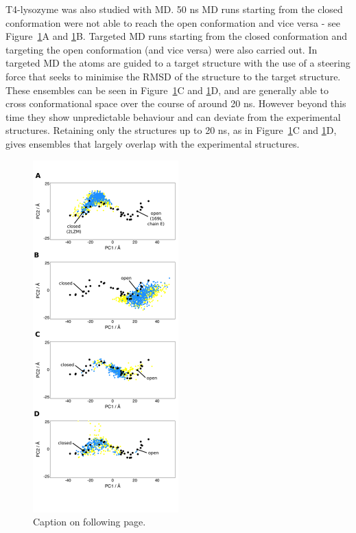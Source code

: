 T4-lysozyme was also studied with MD.
50 ns MD runs starting from the closed conformation were not able to reach the open conformation and vice versa - see Figure~\ref{fig:t4l_md}A and \ref{fig:t4l_md}B.
Targeted MD runs starting from the closed conformation and targeting the open conformation (and vice versa) were also carried out.
In targeted MD the atoms are guided to a target structure with the use of a steering force that seeks to minimise the RMSD of the structure to the target structure.
These ensembles can be seen in Figure~\ref{fig:t4l_md}C and \ref{fig:t4l_md}D, and are generally able to cross conformational space over the course of around 20 ns.
However beyond this time they show unpredictable behaviour and can deviate from the experimental structures.
Retaining only the structures up to 20 ns, as in Figure~\ref{fig:t4l_md}C and \ref{fig:t4l_md}D, gives ensembles that largely overlap with the experimental structures.


\begin{figure}
\centering

\includegraphics[width=0.5\textwidth]{figures/t4l_md/t4l_md}

\caption{Caption on following page.}

\label{fig:t4l_md}
\end{figure}

